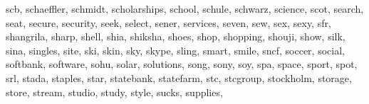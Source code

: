 \documentclass[letterpaper,10pt,english]{sphinxmanual}
\begin{document}
\begin{fulllineitems}
\begin{fulllineitems}
\textquotesingle{}scb\textquotesingle{}, \textquotesingle{}schaeffler\textquotesingle{}, \textquotesingle{}schmidt\textquotesingle{}, \textquotesingle{}scholarships\textquotesingle{}, \textquotesingle{}school\textquotesingle{}, \textquotesingle{}schule\textquotesingle{}, \textquotesingle{}schwarz\textquotesingle{}, \textquotesingle{}science\textquotesingle{}, \textquotesingle{}scot\textquotesingle{}, \textquotesingle{}search\textquotesingle{}, \textquotesingle{}seat\textquotesingle{}, \textquotesingle{}secure\textquotesingle{}, \textquotesingle{}security\textquotesingle{}, \textquotesingle{}seek\textquotesingle{}, \textquotesingle{}select\textquotesingle{}, \textquotesingle{}sener\textquotesingle{}, \textquotesingle{}services\textquotesingle{}, \textquotesingle{}seven\textquotesingle{}, \textquotesingle{}sew\textquotesingle{}, \textquotesingle{}sex\textquotesingle{}, \textquotesingle{}sexy\textquotesingle{}, \textquotesingle{}sfr\textquotesingle{}, \textquotesingle{}shangrila\textquotesingle{}, \textquotesingle{}sharp\textquotesingle{}, \textquotesingle{}shell\textquotesingle{}, \textquotesingle{}shia\textquotesingle{}, \textquotesingle{}shiksha\textquotesingle{}, \textquotesingle{}shoes\textquotesingle{}, \textquotesingle{}shop\textquotesingle{}, \textquotesingle{}shopping\textquotesingle{}, \textquotesingle{}shouji\textquotesingle{}, \textquotesingle{}show\textquotesingle{}, \textquotesingle{}silk\textquotesingle{}, \textquotesingle{}sina\textquotesingle{}, \textquotesingle{}singles\textquotesingle{}, \textquotesingle{}site\textquotesingle{}, \textquotesingle{}ski\textquotesingle{}, \textquotesingle{}skin\textquotesingle{}, \textquotesingle{}sky\textquotesingle{}, \textquotesingle{}skype\textquotesingle{}, \textquotesingle{}sling\textquotesingle{}, \textquotesingle{}smart\textquotesingle{}, \textquotesingle{}smile\textquotesingle{}, \textquotesingle{}sncf\textquotesingle{}, \textquotesingle{}soccer\textquotesingle{}, \textquotesingle{}social\textquotesingle{}, \textquotesingle{}softbank\textquotesingle{}, \textquotesingle{}software\textquotesingle{}, \textquotesingle{}sohu\textquotesingle{}, \textquotesingle{}solar\textquotesingle{}, \textquotesingle{}solutions\textquotesingle{}, \textquotesingle{}song\textquotesingle{}, \textquotesingle{}sony\textquotesingle{}, \textquotesingle{}soy\textquotesingle{}, \textquotesingle{}spa\textquotesingle{}, \textquotesingle{}space\textquotesingle{}, \textquotesingle{}sport\textquotesingle{}, \textquotesingle{}spot\textquotesingle{}, \textquotesingle{}srl\textquotesingle{}, \textquotesingle{}stada\textquotesingle{}, \textquotesingle{}staples\textquotesingle{}, \textquotesingle{}star\textquotesingle{}, \textquotesingle{}statebank\textquotesingle{}, \textquotesingle{}statefarm\textquotesingle{}, \textquotesingle{}stc\textquotesingle{}, \textquotesingle{}stcgroup\textquotesingle{}, \textquotesingle{}stockholm\textquotesingle{}, \textquotesingle{}storage\textquotesingle{}, \textquotesingle{}store\textquotesingle{}, \textquotesingle{}stream\textquotesingle{}, \textquotesingle{}studio\textquotesingle{}, \textquotesingle{}study\textquotesingle{}, \textquotesingle{}style\textquotesingle{}, \textquotesingle{}sucks\textquotesingle{}, \textquotesingle{}supplies\textquotesingle{}, 
\end{fulllineitems}
\end{fulllineitems}
\end{document}

